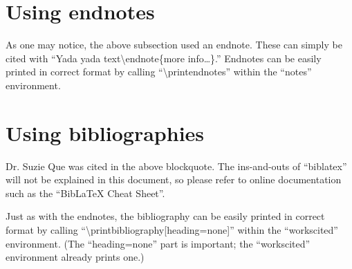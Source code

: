 \documentclass[mla8]{mla}
\begin{document}
\begin{paper}
\section{Using endnotes}

As one may notice, the above subsection used an endnote.
These can simply be cited with
``Yada yada text\textbackslash{}endnote\{more info\ldots\}.''
Endnotes can be easily printed in correct format by calling
``\textbackslash{}printendnotes'' within the
``notes'' environment.

\section{Using bibliographies}

Dr. Suzie Que was cited in the above blockquote.
The ins-and-outs of ``biblatex'' will not be explained in this
document, so please refer to online documentation such as the
``BibLaTeX Cheat Sheet''.

Just as with the endnotes,
the bibliography can be easily printed in correct format by calling
``\textbackslash{}printbibliography[heading=none]'' within the
``workscited'' environment.
(The ``heading=none'' part is important; the ``workscited'' environment
already prints one.)

\end{paper}

\begin{notes}

\printendnotes

\end{notes}

\begin{workscited}

\printbibliography[heading=none]

\end{workscited}
\end{document}
